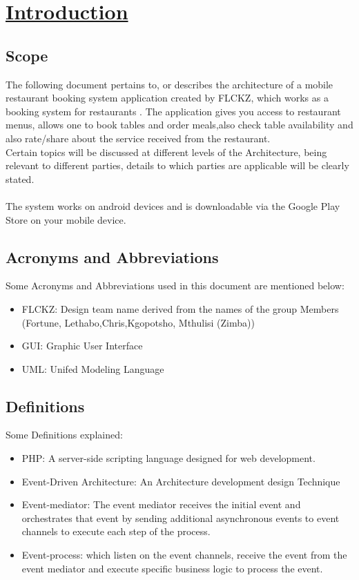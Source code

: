 \documentclass{article}
\begin{document}
\tableofcontents
\pagebreak
\section{\underline{Introduction}}
\subsection{Scope}
The following document  pertains to, or describes the architecture of a mobile restaurant booking system application created by FLCKZ,  which works as a booking system for restaurants . The application gives you access to restaurant menus, allows one to book tables and order meals,also check table availability and also rate/share about the service received from the restaurant.\\
Certain topics will be discussed at different levels of the Architecture, being relevant to different parties, details to which parties are applicable will be clearly stated.\\\\ The system works on android devices and is downloadable via the Google Play Store on your mobile device.\\

\subsection{{Acronyms and Abbreviations}}
Some Acronyms and Abbreviations used in this document are mentioned below:
\begin{itemize}
\item FLCKZ: Design team name derived from the names of the group Members (Fortune, Lethabo,Chris,Kgopotsho, Mthulisi (Zimba))
\item GUI: Graphic User Interface
\item UML: Unifed Modeling Language

\end{itemize}
\subsection{{Definitions}}
Some Definitions explained:
\begin{itemize}
\item PHP: A server-side scripting language designed for web development.
\item Event-Driven Architecture: An Architecture development design Technique
\item Event-mediator: The event mediator receives the initial event and
orchestrates that event by sending additional asynchronous events
to event channels to execute each step of the process.
\item Event-process: which listen on the event channels, receive the event from the
event mediator and execute specific business logic to process the
event.


\end{itemize}
\end{document}
